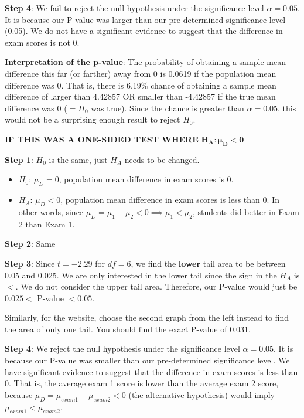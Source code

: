 \documentclass[12pt]{article}
\begin{document}
\noindent \textbf{Step 4}: We fail to reject the null hypothesis under the significance level $\alpha = 0.05$. It is because our P-value was larger than our pre-determined significance level (0.05). We do not have a significant evidence to suggest that the difference in exam scores is not 0.

\noindent \textbf{Interpretation of the p-value}: The probability of obtaining a sample mean difference this far (or farther) away from 0 is 0.0619 if the population mean difference was 0. That is, there is 6.19\% chance of obtaining a sample mean difference of larger than 4.42857 OR smaller than -4.42857 if the true mean difference was 0 ($= H_0$ was true). Since the chance is greater than $\alpha = 0.05$, this would not be a surprising enough result to reject $H_0$.

\pagebreak

\textbf{IF THIS WAS A ONE-SIDED TEST WHERE} $\mathbf{H_A: \boldsymbol\mu_D < 0}$

\vspace{10 pt}

\noindent \textbf{Step 1}: $H_0$ is the same, just $H_A$ needs to be changed.
\begin{itemize}
	\item $H_0$: $\mu_D = 0$, population mean difference in exam scores is 0.
	\item $H_A$: $\mu_D < 0$, population mean difference in exam scores is less than 0. In other words, since $\mu_D = \mu_1 - \mu_2 < 0 \implies \mu_1 < \mu_2$, students did better in Exam 2 than Exam 1.
\end{itemize}

\noindent \textbf{Step 2}: Same

\noindent \textbf{Step 3}: Since $t = -2.29$ for $df = 6$, we find the \textbf{lower} tail area to be between 0.05 and 0.025. We are only interested in the lower tail since the sign in the $H_A$ is $<$. We do not consider the upper tail area. Therefore, our P-value would just be $0.025 <$ P-value $< 0.05$.

Similarly, for the website, choose the second graph from the left instead to find the area of only one tail. You should find the exact P-value of 0.031.

\noindent \textbf{Step 4}: We reject the null hypothesis under the significance level $\alpha = 0.05$. It is because our P-value was smaller than our pre-determined significance level. We have significant evidence to suggest that the difference in exam scores is less than 0. That is, the average exam 1 score is lower than the average exam 2 score, because $\mu_D = \mu_{exam1} - \mu_{exam2} < 0$ (the alternative hypothesis) would imply $\mu_{exam1} < \mu_{exam2}$.
\end{document}
